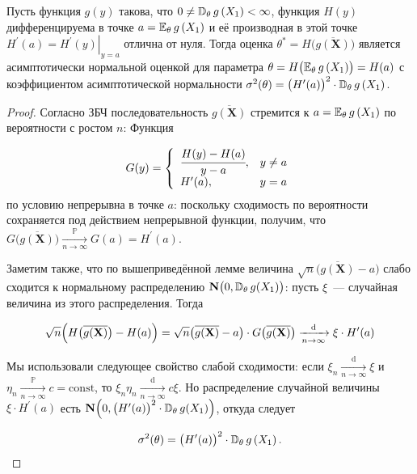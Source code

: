 \begin{thm*}
    Пусть функция $g(y)$ такова, что $0 \neq \mathbb{D}_{\theta}\, g\left(X_{1}\right)<\infty$, функция $H(y)$ дифференцируема в точке $a=\mathbb{E}_{\theta}\, g\left(X_{1}\right)$ и её производная в этой точке $H^{\prime}(a)=\left.H^{\prime}(y)\right|_{y=a}$ отлична от нуля. 
    Тогда оценка $\theta^{*}=H\bigl(\overline{g(\mathbf{X})}\bigr)$ является асимптотически нормальной оценкой для параметра $\theta = H\bigl(\mathbb{E}_{\theta}\, g\left(X_{1}\right)\bigr) = H(a)$ с коэффициентом асимптотической нормальности $\sigma^{2}(\theta)=\bigl(H^{\prime}(a)\bigr)^{2} \cdot \mathbb{D}_{\theta}\, g\left(X_{1}\right)$.
\end{thm*}

\begin{proof}
    Согласно ЗБЧ последовательность $\overline{g(\mathbf{X})}$ стремится к $a=\mathbb{E}_{\theta}\, g\left(X_{1}\right)$ по вероятности с ростом $n$: Функция

    \begin{equation*}
        G(y)=\left\{\begin{array}{ll}
        \cfrac{H(y)-H(a)}{y-a}, & y \neq a \\
        H^{\prime}(a), & y=a
        \end{array}\right.  
    \end{equation*}
    по условию непрерывна в точке $a$: 
    поскольку сходимость по вероятности сохраняется под действием непрерывной функции, получим,
    что $G\bigl(\overline{g(\mathbf{X})}\bigr) \xrightarrow[n \to \infty]{\mathbb{P}} G(a)=H^{\prime}(a)$.

    Заметим также, что по вышеприведённой лемме величина ${\sqrt{n}\bigl(\overline{g(\mathbf{X})} - a\bigr)}$ слабо сходится
    к нормальному распределению $\mathbf{N}\bigl(0, \mathbb{D}_{\theta}\, g(X_{1})\bigr)$: 
    пусть $\xi$~--- случайная величина из этого распределения. Тогда

    \begin{equation*}
        \sqrt{n} \Bigl(H\bigl(\overline{g(\mathbf{X})}\bigr) - H(a)\Bigr) = 
        \sqrt{n} \bigl(\overline{g(\mathbf{X})} - a\bigr) \cdot G\bigl(\overline{g(\mathbf{X})}\bigr) 
        \xrightarrow[n \to \infty]{\text{d}} \xi \cdot H^{\prime}(a)
    \end{equation*}

    Мы использовали следующее свойство слабой сходимости: если $\xi_{n} \xrightarrow[n \to \infty]{\text{d}} \xi$ и $\eta_{n} \xrightarrow[n \to \infty]{\mathbb{P}} c=\mathrm{const}$, то $\xi_{n} \eta_{n} \xrightarrow[n \to \infty]{\text{d}} c \xi$.
    Но распределение случайной величины $\xi \cdot H^{\prime}(a)$ есть $\mathbf{N}\Bigl(0,\bigl(H^{\prime}(a)\bigr)^{2} \cdot \mathbb{D}_{\theta}\, g(X_{1})\Bigr)$, откуда следует

    \begin{equation*}
        \sigma^{2}(\theta)=\bigl(H^{\prime}(a)\bigr)^{2} \cdot \mathbb{D}_{\theta}\, g\left(X_{1}\right).
    \end{equation*}
\end{proof}
